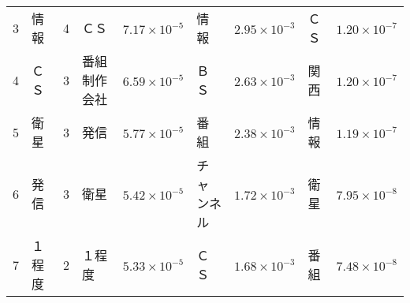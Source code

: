 \begin{table}[htbp]
\begin{center}
\begin{tabular}{|r|ll|ll|ll|ll|}
  3	  & 情報     & \hspace{-2mm}4\hspace{-1.0mm} & ＣＳ           & \hspace{-2mm}$7.17\times 10^{-5}$\hspace{-1.5mm} & 情報       & \hspace{-2mm}$2.95\times 10^{-3}$\hspace{-1.5mm} & ＣＳ       & \hspace{-2mm}$1.20\times 10^{-7}$\hspace{-1.5mm} \\
  4	  & ＣＳ     & \hspace{-2mm}3\hspace{-1.0mm} & 番組制作会社   & \hspace{-2mm}$6.59\times 10^{-5}$\hspace{-1.5mm} & ＢＳ       & \hspace{-2mm}$2.63\times 10^{-3}$\hspace{-1.5mm} & 関西       & \hspace{-2mm}$1.20\times 10^{-7}$\hspace{-1.5mm} \\
  5	  & 衛星     & \hspace{-2mm}3\hspace{-1.0mm} & 発信           & \hspace{-2mm}$5.77\times 10^{-5}$\hspace{-1.5mm} & 番組       & \hspace{-2mm}$2.38\times 10^{-3}$\hspace{-1.5mm} & 情報       & \hspace{-2mm}$1.19\times 10^{-7}$\hspace{-1.5mm} \\
  6	  & 発信     & \hspace{-2mm}3\hspace{-1.0mm} & 衛星           & \hspace{-2mm}$5.42\times 10^{-5}$\hspace{-1.5mm} & チャンネル & \hspace{-2mm}$1.72\times 10^{-3}$\hspace{-1.5mm} & 衛星       & \hspace{-2mm}$7.95\times 10^{-8}$\hspace{-1.5mm} \\
  7	  & １程度   & \hspace{-2mm}2\hspace{-1.0mm} & １程度         & \hspace{-2mm}$5.33\times 10^{-5}$\hspace{-1.5mm} & ＣＳ       & \hspace{-2mm}$1.68\times 10^{-3}$\hspace{-1.5mm} & 番組       & \hspace{-2mm}$7.48\times 10^{-8}$\hspace{-1.5mm} \\

\end{tabular}
\end{center}
\end{table}
